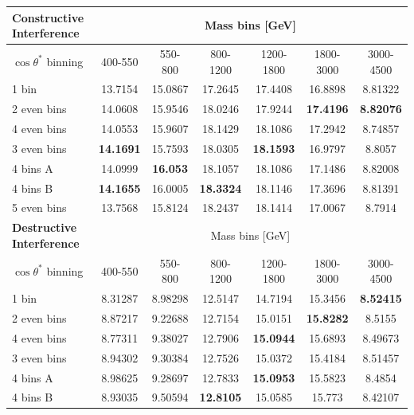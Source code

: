     \begin {table}[h!]
        \small 
        \begin{center}
        \begin{tabular}{ |l|c|c|c|c|c|c| } 
            \hline
            \hline
            {\bf Constructive Interference} & \multicolumn{6}{c|}{Mass bins [GeV]} \\ 
            \hline
            $\cos{\theta^{*}}$ binning & 400-550 & 550-800 & 800-1200 & 1200-1800 & 1800-3000 & 3000-4500 \\
            \hline
            1 bin       & 13.7154 & 15.0867 & 17.2645 & 17.4408 & 16.8898 & 8.81322 \\
            2 even bins & 14.0608 & 15.9546 & 18.0246 & 17.9244 & {\bf17.4196} & {\bf8.82076} \\
            4 even bins & 14.0553 & 15.9607 & 18.1429 & 18.1086 & 17.2942 & 8.74857 \\
            3 even bins & {\bf14.1691} & 15.7593 & 18.0305 & {\bf18.1593} & 16.9797 & 8.8057 \\
            4 bins A    & 14.0999 & {\bf16.053}  & 18.1057 & 18.1086 & 17.1486 & 8.82008 \\
            4 bins B    & {\bf14.1655} & 16.0005 & {\bf18.3324} & 18.1146 & 17.3696 & 8.81391 \\
            5 even bins & 13.7568 & 15.8124 & 18.2437 & 18.1414 & 17.0067 & 8.7914 \\
            \hline
            \hline
            {\bf Destructive Interference} & \multicolumn{6}{c|}{Mass bins [GeV]} \\
            \hline
            $\cos{\theta^{*}}$ binning & 400-550 & 550-800 & 800-1200 & 1200-1800 & 1800-3000 & 3000-4500 \\
            \hline
            1 bin       & 8.31287 & 8.98298 & 12.5147 & 14.7194 & 15.3456 & {\bf8.52415} \\
            2 even bins & 8.87217 & 9.22688 & 12.7154 & 15.0151 & {\bf15.8282} & 8.5155 \\
            4 even bins & 8.77311 & 9.38027 & 12.7906 & {\bf15.0944} & 15.6893 & 8.49673 \\
            3 even bins & 8.94302 & 9.30384 & 12.7526 & 15.0372 & 15.4184 & 8.51457 \\
            4 bins A    & 8.98625 & 9.28697 & 12.7833 & {\bf15.0953} & 15.5823 & 8.4854 \\
            4 bins B    & 8.93035 & 9.50594 & {\bf12.8105} & 15.0585 & 15.773 & 8.42107 \\

\end{tabular}
\end{center}
\end{table}
